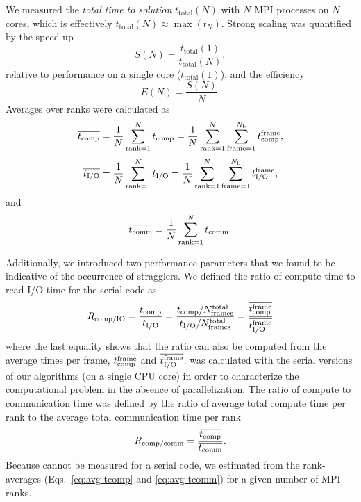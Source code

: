 We measured the \emph{total time to solution} $t_{\text{total}}(N)$ with $N$ MPI processes on $N$ cores, which is effectively
$t_{\text{total}}(N) \approx \max(t_{N})$. 
Strong scaling was quantified by the speed-up
\begin{equation}
  \label{eq:speedup}
  S(N) = \frac{t_{\text{total}}(1)}{t_{\text{total}}(N)},
\end{equation}
relative to performance on a single core ($t_{\text{total}}(1)$), and the efficiency
\begin{equation}
  \label{eq:efficiency}
  E(N) = \frac{S(N)}{N}.
\end{equation}
Averages over ranks were calculated as
\begin{equation}
  \label{eq:avg-tcomp}
  \overline{{t}_{\text{comp}}} = \frac{1}{N}
  \sum_{\text{rank}=1}^{N}{t}_{\text{comp}} = \frac{1}{N}\sum_{\text{rank}=1}^{N}\sum_{\text{frame}=1}^{N_\text{b}}{t}_{\text{comp}}^{\text{frame}},
\end{equation}
\begin{equation}
  \label{eq:avg-tIO}
  \overline{{t}_{\text{I/O}}} = \frac{1}{N}\sum_{\text{rank}=1}^{N}{t}_{\text{I/O}} = \frac{1}{N}\sum_{\text{rank}=1}^{N}\sum_{\text{frame}=1}^{N_{\text{b}}}{t}_{\text{I/O}}^{\text{frame}},
\end{equation}
and
\begin{equation}
  \label{eq:avg-tcomm}
  \overline{t_{\text{comm}}} = \frac{1}{N}\sum_{\text{rank}=1}^{N}t_{\text{comm}}.
\end{equation}

Additionally, we introduced two performance parameters that we found to be indicative of the occurrence of stragglers.
We defined the ratio of compute time to read I/O time for the serial code as
\begin{equation}
  \RcompIO = \frac{\tcomp}{\tIO} = %
  \frac{\tcomp/N_{\text{frames}}^{\text{total}}}{\tIO/N_{\text{frames}}^{\text{total}}}  = %
  \frac{\overline{\tcomp^{\text{frame}}}}{\overline{\tIO^{\text{frame}}}}  
  \label{eq:Compute-IO}
\end{equation}
where the last equality shows that the ratio can also be computed from the average times per frame, $\overline{{t}_{\text{comp}}^{\text{frame}}}$ and $\overline{{t}_{\text{I/O}}^{\text{frame}}}$.
\RcompIO was calculated with the serial versions of our algorithms (on a single CPU core) in order to characterize the computational problem in the absence of parallelization.
The ratio of compute to communication time was defined by the ratio of average total compute time per rank to the average total communication time per rank  
\begin{equation}
  \label{eq:Compute-comm}
  R_{\text{comp/comm}} = \frac{\overline{{t}_{\text{comp}}}}{\overline{t_{\text{comm}}}}.
\end{equation}
Because \tcomm cannot be measured for a serial code, we estimated \Rcompcomm from the rank-averages (Eqs.~\ref{eq:avg-tcomp} and \ref{eq:avg-tcomm}) for a given number of MPI ranks.
